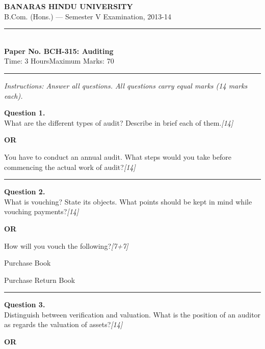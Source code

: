 \documentclass[11pt,a4paper]{article}
\newcommand{\pts}[1]{\hfill   \textit{[#1]}}
\begin{document}
\begin{center}
  {\large\bfseries BANARAS HINDU UNIVERSITY}\\[2pt]
  {\normalsize B.Com. (Hons.) --- Semester V Examination, 2013-14}\\[6pt]
  \rule{0.8\linewidth}{0.5pt}\\[6pt]
  {\large\bfseries Paper No. BCH-315: Auditing}\\[4pt]
  {\normalsize Time: 3 Hours\hfill Maximum Marks: 70}
\end{center}

\rule{\linewidth}{0.4pt}

\smallskip



\noindent   \textit{Instructions: Answer all questions. All questions carry equal marks (14 marks each).}

\bigskip




\noindent   \textbf{Question 1.} \\
What are the different types of audit? Describe in brief each of them.\pts{14}

\centerline{   \textbf{OR}}

You have to conduct an annual audit. What steps would you take before commencing the actual work of audit?\pts{14}

\medskip\rule{\linewidth}{0.2pt}




\noindent   \textbf{Question 2.} \\
What is vouching? State its objects. What points should be kept in mind while vouching payments?\pts{14}

\centerline{   \textbf{OR}}

How will you vouch the following?\pts{7+7}

\begin{parts}
  \item Purchase Book
  \item Purchase Return Book
\end{parts}

\medskip\rule{\linewidth}{0.2pt}

\pagebreak




\noindent   \textbf{Question 3.} \\
Distinguish between verification and valuation. What is the position of an auditor as regards the valuation of assets?\pts{14}

\centerline{   \textbf{OR}}
\end{document}
